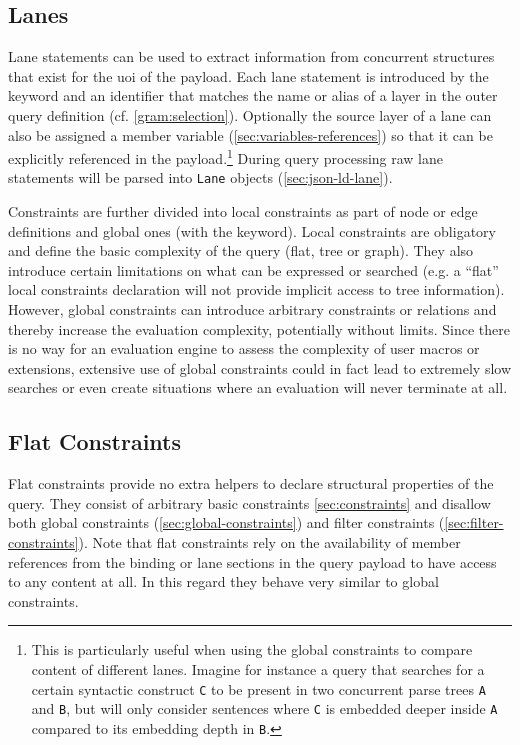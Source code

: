 \documentclass[11pt,a4paper]{report}
\newcommand{\iqlType}[1]{\texttt{\iqlns#1}}
\begin{document}

\subsection{Lanes}
\label{sec:lanes}
\noindent Lane statements can be used to extract information from concurrent structures that exist for the \ac{uoi} of the payload.
Each lane statement is introduced by the  keyword and an identifier that matches the name or alias of a layer in the outer query definition (cf. \cref{gram:selection}).
Optionally the source layer of a lane can also be assigned a member variable (\ref{sec:variables-references}) so that it can be explicitly referenced in the payload.\footnote{This is particularly useful when using the global constraints to compare content of different lanes. Imagine for instance a query that searches for a certain syntactic construct \texttt{C} to be present in two concurrent parse trees \texttt{A} and \texttt{B}, but will only consider sentences where \texttt{C} is embedded deeper inside \texttt{A} compared to its embedding depth in \texttt{B}.}
During query processing raw lane statements will be parsed into \iqlType{Lane} objects (\ref{sec:json-ld-lane}).


Constraints are further divided into local constraints as part of node or edge definitions and global ones (with the  keyword). 
Local constraints are obligatory and define the basic complexity of the query (flat, tree or graph). 
They also introduce certain limitations on what can be expressed or searched (e.g. a ``flat'' local constraints declaration will not provide implicit access to tree information). 
However, global constraints can introduce arbitrary constraints or relations and thereby increase the evaluation complexity, potentially without limits. 
Since there is no way for an evaluation engine to assess the complexity of user macros or extensions, extensive use of global constraints could in fact lead to extremely slow searches or even create situations where an evaluation will never terminate at all.

\subsection{Flat Constraints}
\label{sec:flat-constraints}

Flat constraints provide no extra helpers to declare structural properties of the query. 
They consist of arbitrary basic constraints \cref{sec:constraints} and disallow both global constraints (\ref{sec:global-constraints}) and filter constraints (\ref{sec:filter-constraints}). 
Note that flat constraints rely on the availability of member references from the binding or lane sections in the query payload to have access to any content at all.
In this regard they behave very similar to global constraints.
\end{document}
